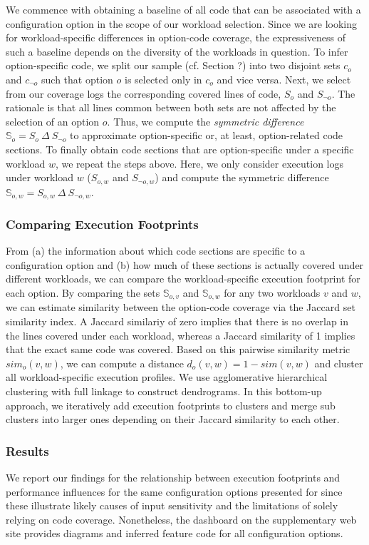 {{\color{edited}
We commence with obtaining a baseline of all code that can be associated with a configuration option in the scope of our workload selection. Since we are looking for workload-specific differences in option-code coverage, the expressiveness of such a baseline depends on the diversity of the workloads in question. To infer option-specific code, we split our sample (cf. Section ?) into two disjoint sets $c_o$ and $c_{\neg o}$ such that option $o$ is selected only in $c_o$ and vice versa. Next, we select from our coverage logs the corresponding covered lines of code, $S_o$ and $S_{\neg o}$.  The rationale is that all lines common between both sets are not affected by the selection of an option $o$. Thus, we compute the \textit{symmetric difference} $\mathbb{S}_o = S_o~\Delta~S_{\neg o}$ to approximate option-specific or, at least, option-related code sections. To finally obtain code sections that are option-specific under a specific workload $w$, we repeat the steps above. Here, we only consider execution logs under workload $w$ ($S_{o, w}$ and $S_{\neg o, w}$) and compute the symmetric difference $\mathbb{S}_{o,w}=S_{o,w}~\Delta~S_{\neg o, w}$.  


\subsubsection{Comparing Execution Footprints}
From (a) the information about which code sections are specific to a configuration option and (b) how much of these sections is actually covered under different workloads, we can compare the workload-specific execution footprint for each option. By comparing the sets $\mathbb{S}_{o, v}$ and $\mathbb{S}_{o, w}$ for any two workloads $v$ and $w$, we can estimate similarity between the option-code coverage via the Jaccard set similarity index. A Jaccard similariy of zero implies that there is no overlap in the lines covered under each workload, whereas a Jaccard similarity of 1 implies that the exact same code was covered. Based on this pairwise similarity metric $sim_o(v, w)$, we can compute a distance $d_o(v, w) = 1 - sim(v, w)$ and cluster all workload-specific execution profiles. 
We use agglomerative hierarchical clustering with full linkage to construct dendrograms. In this bottom-up approach, we iteratively add execution footprints to clusters and merge sub clusters into larger ones depending on their Jaccard similarity  to each other. 

\subsubsection{Results}
We report our findings for the relationship between execution footprints and performance influences for the same configuration options presented for  since these illustrate likely causes of input sensitivity and the limitations of solely relying on code coverage. Nonetheless, the dashboard on the supplementary web site provides diagrams and inferred feature code for all configuration options.

}}
